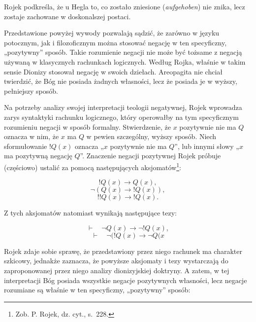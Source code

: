 Rojek podkreśla, że u Hegla to, co zostało zniesione
(\textit{aufgehoben}) nie znika, lecz zostaje zachowane w doskonalszej
postaci.

Przedstawione powyżej wywody pozwalają sądzić, że zarówno w języku
potocznym, jak i filozoficznym można stosować negację w ten
specyficzny, „pozytywny” sposób. Takie rozumienie negacji nie może być
tożsame z negacją używaną w klasycznych rachunkach logicznych. Według
Rojka, właśnie w takim sensie Dionizy stosował negację w swoich
dziełach. Areopagita nie chciał twierdzić, że Bóg nie posiada żadnych
własności, lecz że posiada je w wyższy, pełniejszy sposób.

Na potrzeby analizy swojej interpretacji teologii negatywnej, Rojek
wprowadza zarys syntaktyki rachunku logicznego, który operowałby na tym
specyficznym rozumieniu negacji w sposób formalny. Stwierdzenie, że $x$
pozytywnie nie ma $Q$ oznacza w nim, że $x$ ma $Q$ w pewien szczególny,
wyższy sposób. Niech sformułowanie $!Q(x)$ oznacza „$x$ pozytywnie nie ma
$Q$”, lub innymi słowy „$x$ ma pozytywną negację $Q$”. Znaczenie negacji
pozytywnej Rojek próbuje (częściowo) ustalić za pomocą następujących
aksjomatów\footnote{Zob. P. Rojek, dz. cyt., s.~228. }:


\begin{equation}\label{A1}\tag{A1}
    !Q(x) \to  Q(x),
\end{equation}
\begin{equation}\label{A2}\tag{A2}
    \neg (Q(x) \to !Q(x)),
\end{equation}
\begin{equation}\label{A3}\tag{A3}
    !!Q(x) \to  !Q(x).
\end{equation}


Z tych aksjomatów natomiast wynikają następujące tezy:


\begin{equation}
    \vdash \quad \neg Q(x) \to  \neg !Q(x),
\end{equation}
\begin{equation}
    \vdash \quad \neg (!Q(x) \to  \neg Q(x
\end{equation}



Rojek zdaje sobie sprawę, że przedstawiony przez niego rachunek ma
charakter szkicowy, jednakże zaznacza, że powyższe aksjomaty i tezy
wystarczają do zaproponowanej przez niego analizy dionizyjskiej
doktryny. A zatem, w tej interpretacji Bóg posiada wszystkie negacje
pozytywnych własności, lecz negacje rozumiane są właśnie w ten
specyficzny, „pozytywny” sposób:




